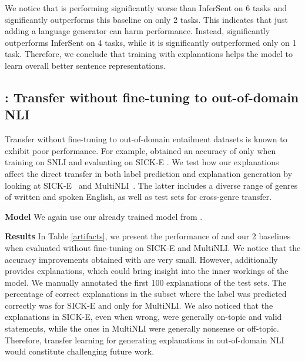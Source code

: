 We notice that \inferSentAutoencoder{} is performing significantly worse than InferSent on 6 tasks and significantly outperforms this baseline on only 2 tasks. This indicates that just adding a language generator can harm performance. Instead, \eInferSent{} significantly outperforms InferSent on 4 tasks, while it is significantly outperformed only on 1 task. Therefore, we conclude that training with explanations helps the model to learn overall better sentence representations.

\subsection{\expfour{}: Transfer without fine-tuning to out-of-domain NLI}
\label{exp4}

Transfer without fine-tuning to out-of-domain entailment datasets is known to exhibit poor performance. For example, \citet{snli} obtained an accuracy of only  when training on SNLI and evaluating on SICK-E \cite{sick}. We test how our explanations affect the direct transfer in both label prediction and explanation generation by looking at SICK-E~\cite{sick} and MultiNLI~\cite{multinli}. The latter includes a diverse range of genres of written and spoken English, as well as test sets for cross-genre transfer.

\textbf{Model   } We again use our already trained \eInferSent{} model from \expone.

\textbf{Results   } In Table \ref{artifacts}, we present the performance of \eInferSent{} and our 2 baselines when evaluated without fine-tuning on SICK-E and MultiNLI. We notice that the accuracy improvements obtained with \eInferSent{} are very small. However, \eInferSent{} additionally provides explanations, which could bring insight into the inner workings of the model. We manually annotated the first 100 explanations of the test sets. The percentage of correct explanations in the subset where the label was predicted correctly was  for SICK-E and only  for MultiNLI.
We also noticed that the explanations in SICK-E, even when wrong, were generally on-topic and valid statements, while the ones in MultiNLI were generally nonsense or off-topic. Therefore, transfer learning for generating explanations in out-of-domain NLI would constitute challenging future work.

